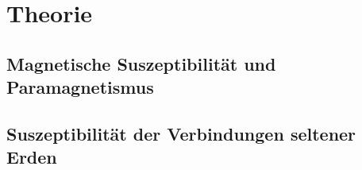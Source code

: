 
\section{Theorie}

\subsection{Magnetische Suszeptibilität und Paramagnetismus}

\subsection{Suszeptibilität der Verbindungen seltener Erden}
